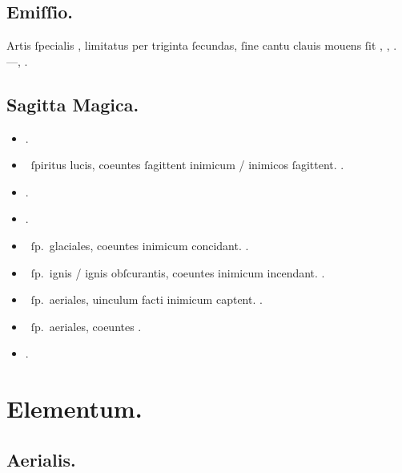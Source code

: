\documentclass[12pt]{book}
\begin{document}
\subsection{Emiſſio.}\label{emissio}

Artis ſpecialis , limitatus per triginta ſecundas,
ſine cantu clauis mouens ſit , ,
.
---, .

\subsection{Sagitta Magica.}\label{sagitta-magica}

\begin{itemize}
  \item {}.
  \item {}~ſpiritus lucis, coeuntes ſagittent inimicum / inimicos ſagittent. .
  \item \textelp{} .
  \item \textelp{} .
  \item {}~ſp.~glaciales, coeuntes inimicum concidant. .
  \item {}~ſp.~ignis / ignis obſcurantis, coeuntes inimicum incendant. .
  \item {}~ſp.~aeriales, uinculum facti inimicum captent. .
  \item {}~ſp.~aeriales, coeuntes \textelp{} .
  \item \textelp{} .
\end{itemize}

\section{Elementum.}\label{elementum}
\subsection{Aerialis.}\label{aerialis}
\end{document}

